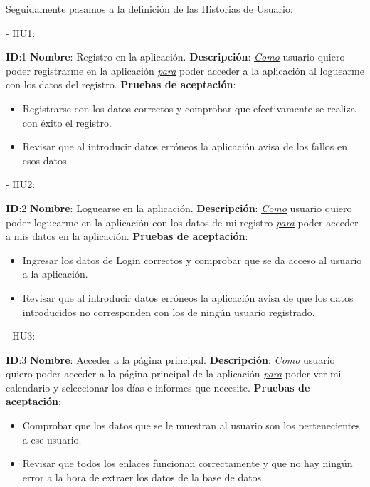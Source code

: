 \documentclass[11pt,openany]{book}
\begin{document}
Seguidamente pasamos a la definición de las Historias de Usuario:

- HU1:
 
\textbf{ID}:1 \textbf{Nombre}: Registro en la aplicación.\linebreak
\textbf{Descripción}: \textit{\underline{Como}} usuario quiero poder registrarme en la aplicación \textit{\underline{para}} poder acceder a la aplicación al loguearme con los datos del registro.\linebreak
\textbf{Pruebas de aceptación}:
\begin{itemize}
\item Registrarse con los datos correctos y comprobar que efectivamente se realiza con éxito el registro.
\item Revisar que al introducir datos erróneos la aplicación avisa de los fallos en esos datos.
\end{itemize}
 
- HU2:
 
\textbf{ID}:2 \textbf{Nombre}: Loguearse en la aplicación.\linebreak
\textbf{Descripción}: \textit{\underline{Como}} usuario quiero poder loguearme en la aplicación con los datos de mi registro \textit{\underline{para}} poder acceder a mis datos en la aplicación.\linebreak
\textbf{Pruebas de aceptación}:
\begin{itemize}
\item Ingresar los datos de Login correctos y comprobar que se da acceso al usuario a la aplicación.
\item Revisar que al introducir datos erróneos la aplicación avisa de que los datos introducidos no corresponden con los de ningún usuario registrado.
\end{itemize}
 
- HU3:
 
\textbf{ID}:3 \textbf{Nombre}: Acceder a la página principal.\linebreak
\textbf{Descripción}: \textit{\underline{Como}} usuario quiero poder acceder a la página principal de la aplicación \textit{\underline{para}} poder ver mi calendario y seleccionar los días e informes que necesite.\linebreak
\textbf{Pruebas de aceptación}:
\begin{itemize}
\item Comprobar que los datos que se le muestran al usuario son los pertenecientes a ese usuario.
\item Revisar que todos los enlaces funcionan correctamente y que no hay ningún error a la hora de extraer los datos de la base de datos.
\end{itemize}
 
\end{document}
